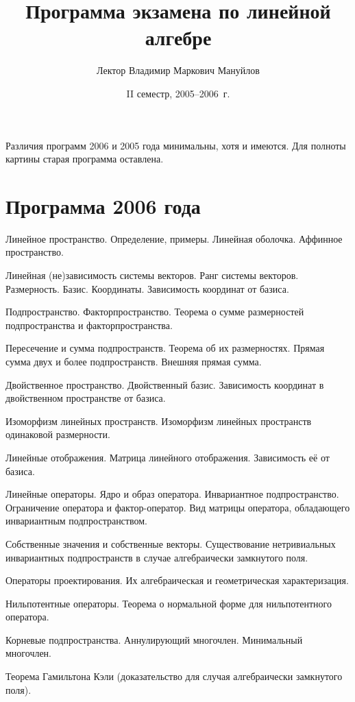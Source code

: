 \documentclass[a4paper]{article}
\title{Программа экзамена по линейной алгебре}
\author{Лектор Владимир Маркович Мануйлов}
\date{II семестр, 2005--2006~г.}
\begin{document}
\maketitle

\centerline{\scriptsize Различия программ 2006 и 2005 года минимальны, хотя и имеются. Для полноты картины старая программа оставлена.}

\section*{Программа 2006 года}

\begin{nums}{-2}
\item Линейное пространство. Определение, примеры. Линейная оболочка. Аффинное пространство.
\item Линейная (не)зависимость системы векторов. Ранг системы векторов. Размерность. Базис. Координаты.
Зависимость координат от базиса.
\item Подпространство. Факторпространство. Теорема о сумме размерностей подпространства и факторпространства.
\item Пересечение и сумма подпространств. Теорема об их размерностях. Прямая сумма двух и более подпространств.
Внешняя прямая сумма.
\item Двойственное пространство. Двойственный базис. Зависимость
координат в двойственном пространстве от базиса.
\item Изоморфизм линейных пространств. Изоморфизм линейных пространств одинаковой размерности.
\item Линейные отображения. Матрица линейного отображения. Зависимость её от базиса.
\item Линейные операторы. Ядро и образ оператора. Инвариантное
подпространство. Ограничение оператора и фактор-оператор. Вид
матрицы оператора, обладающего инвариантным подпространством.
\item Собственные значения и собственные векторы. Существование нетривиальных инвариантных
подпрос\-транств в случае алгебраически замкнутого поля.
\item Операторы проектирования. Их алгебраическая и геометрическая характеризация.
\item Нильпотентные операторы. Теорема о нормальной форме для нильпотентного оператора.
\item Корневые подпространства. Аннулирующий многочлен. Минимальный многочлен.
\item Теорема Гамильтона Кэли (доказательство для случая алгебраически замкнутого поля).

\end{nums}
\end{document}
